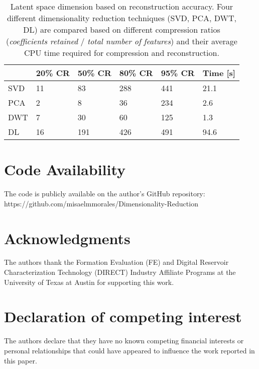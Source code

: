 \documentclass[a4paper,fleqn,12pt]{article}
\begin{document}
\begin{table}[H]
    \label{tab:comparison}
    \centering
    \begin{tabular}{|l|l|l|l|l|l|}
    \hline
        & 20\% CR & 50\% CR & 80\% CR & 95\% CR & Time [s]  \\
    \hline
    SVD & 11  & 83  & 288 & 441 & 21.1          \\
    PCA & 2   & 8   & 36  & 234 & 2.6           \\
    DWT & 7   & 30  & 60  & 125 & 1.3           \\
    DL  & 16  & 191 & 426 & 491 & 94.6          \\
    \hline
    \end{tabular}
    \caption{Latent space dimension based on reconstruction accuracy. Four different dimensionality reduction techniques (SVD, PCA, DWT, DL) are compared based on different compression ratios (\emph{coefficients retained} / \emph{total number of features}) and their average CPU time required for compression and reconstruction.}
\end{table}

\section*{Code Availability}
The code is publicly available on the author's GitHub repository: \\ https://github.com/misaelmmorales/Dimensionality-Reduction

\section*{Acknowledgments}
The authors thank the Formation Evaluation (FE) and Digital Reservoir Characterization Technology (DIRECT) Industry Affiliate Programs at the University of Texas at Austin for supporting this work.

\section*{Declaration of competing interest}
The authors declare that they have no known competing financial interests or personal relationships that could have appeared to influence the work reported in this paper.

\nolinenumbers

\end{document}
